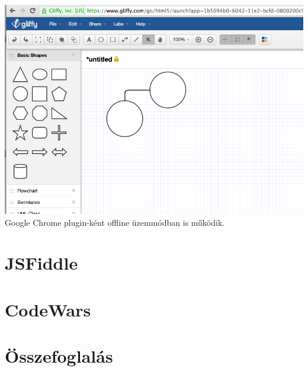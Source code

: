 \includegraphics[width=160mm,keepaspectratio]{figures/gliffy.png}\\


Google Chrome plugin-ként offline üzemmódban is működik.


\section{JSFiddle}
\section{CodeWars}

\section{Összefoglalás}


